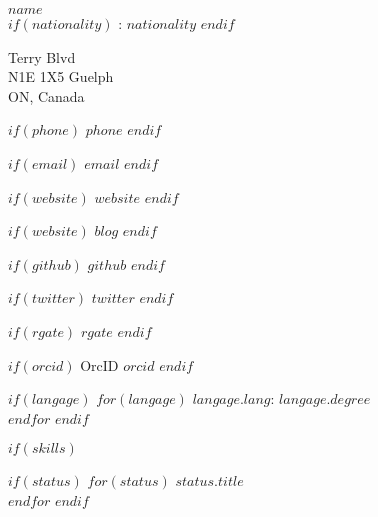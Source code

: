 \documentclass[$fontsize$, letterpaper]{article}
\begin{document}
\begin{multicols}{2}

{\LARGE \textbf{$name$}}\\


$if(nationality)$
: $nationality$
$endif$

\vspace*{.1cm}

\faHome {} Terry Blvd \\ \hspace*{.6cm} N1E 1X5 Guelph \\ \hspace*{.6cm} ON, Canada

$if(phone)$
\faPhone \quad $phone$
$endif$

$if(email)$
\faEnvelope \quad \href{mailto:$email$}{$email$}
$endif$

$if(website)$
\faGlobe \quad \href{http://$website$}{$website$}
$endif$

$if(website)$
\faGlobe \quad \href{http://$blog$}{$blog$}
$endif$

$if(github)$
\faGithub \quad \href{https://github.com/$github$}{$github$}
$endif$

$if(twitter)$
\faTwitter \quad \href{https://twitter.com/$github$}{$twitter$}
$endif$

$if(rgate)$
\faResearchgate \quad \href{https://www.researchgate.net/profile$rgate$}{$rgate$}
$endif$

$if(orcid)$
OrcID \quad \href{http://orcid.org/$orcid$}{$orcid$}
$endif$

\vspace{.2cm}


$if(langage)$
$for(langage)$
\textbf{$langage.lang$}: $langage.degree$ \\
$endfor$
$endif$


$if(skills)$

\columnbreak


$if(status)$
$for(status)$
{\large\textbf{$status.title$}} \\
$endfor$
$endif$

%




\end{multicols}
\end{document}
